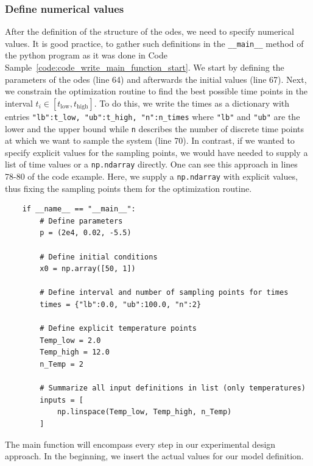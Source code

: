 \documentclass[graybox]{svmult}
\begin{document}
\subsubsection{Define numerical values}
After the definition of the structure of the \acp{ode}, we need to specify numerical values.
It is good practice, to gather such definitions in the \texttt{__main__} method of the python program as it was done in Code Sample~\ref{code:code_write_main_function_start}.
We start by defining the parameters of the \acp{ode} (line 64) and afterwards the initial values (line 67).
Next, we constrain the optimization routine to find the best possible time points in the interval $t_i\in\left[t_\text{low},t_\text{high}\right]$.
To do this, we write the times as a dictionary with entries \texttt{{"lb":t_low, "ub":t_high, "n":n_times}} where \texttt{"lb"} and \texttt{"ub"} are the lower and the upper bound while \texttt{n} describes the number of discrete time points at which we want to sample the system (line 70).
In contrast, if we wanted to specify explicit values for the sampling points, we would have needed to supply a list of time values or a \texttt{np.ndarray} directly.
One can see this approach in lines 78-80 of the code example.
Here, we supply a \texttt{np.ndarray} with explicit values, thus fixing the sampling points them for the optimization routine.
\begin{code}[h]
    \begin{verbatim}
    if __name__ == "__main__":
        # Define parameters
        p = (2e4, 0.02, -5.5)

        # Define initial conditions
        x0 = np.array([50, 1])

        # Define interval and number of sampling points for times
        times = {"lb":0.0, "ub":100.0, "n":2}

        # Define explicit temperature points
        Temp_low = 2.0
        Temp_high = 12.0
        n_Temp = 2

        # Summarize all input definitions in list (only temperatures)
        inputs = [
            np.linspace(Temp_low, Temp_high, n_Temp)
        ]
    \end{verbatim}
    \caption{
        The main function will encompass every step in our experimental design approach.
        In the beginning, we insert the actual values for our model definition.
    }
    \label{code:code_write_main_function_start}
\end{code}
\end{document}
